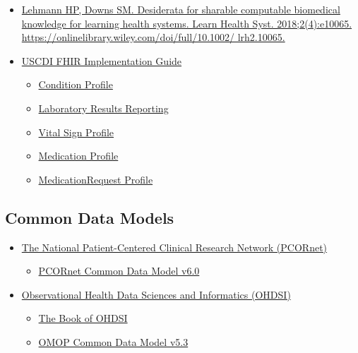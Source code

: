 \documentclass[
]{journal}
\providecommand{\tightlist}{%
  \setlength{\itemsep}{0pt}\setlength{\parskip}{0pt}}
\begin{document}
\begin{itemize}
\item
  \href{https://onlinelibrary.wiley.com/doi/full/10.1002/\%20lrh2.10065}{Lehmann HP, Downs SM. Desiderata for sharable computable biomedical knowledge for learning health systems. Learn Health Syst. 2018;2(4):e10065. https://onlinelibrary.wiley.com/doi/full/10.1002/ lrh2.10065.}
\item
  \href{https://www.hl7.org/fhir/us/core/index.html}{USCDI FHIR Implementation Guide}

  \begin{itemize}
  \item
    \href{https://www.hl7.org/fhir/us/core/StructureDefinition-us-core-condition.html\#notes}{Condition Profile}
  \item
    \href{https://www.hl7.org/fhir/us/core/StructureDefinition-us-core-observation-lab.html\#mandatory-search-parameters}{Laboratory Results Reporting}
  \item
    \href{https://www.hl7.org/fhir/us/core/StructureDefinition-us-core-blood-pressure.html\#mandatory-search-parameters}{Vital Sign Profile}
  \item
    \href{https://www.hl7.org/fhir/us/core/StructureDefinition-us-core-medication.html}{Medication Profile}
  \item
    \href{https://www.hl7.org/fhir/us/core/StructureDefinition-us-core-medicationrequest.html}{MedicationRequest Profile}
  \end{itemize}
\end{itemize}

\hypertarget{common-data-models}{%
\subsection{Common Data Models}\label{common-data-models}}

\begin{itemize}
\item
  \href{https://pcornet.org/}{The National Patient-Centered Clinical Research Network (PCORnet)}

  \begin{itemize}
  \tightlist
  \item
    \href{https://pcornet.org/wp-content/uploads/2022/01/PCORnet-Common-Data-Model-v60-2020_10_221.pdf}{PCORnet Common Data Model v6.0}
  \end{itemize}
\item
  \href{https://www.ohdsi.org/}{Observational Health Data Sciences and Informatics (OHDSI)}

  \begin{itemize}
  \tightlist
  \item
    \href{https://ohdsi.github.io/TheBookOfOhdsi/}{The Book of OHDSI}
  \item
    \href{https://ohdsi.github.io/CommonDataModel/cdm53.html}{OMOP Common Data Model v5.3}
  \end{itemize}
\end{itemize}
\end{document}
